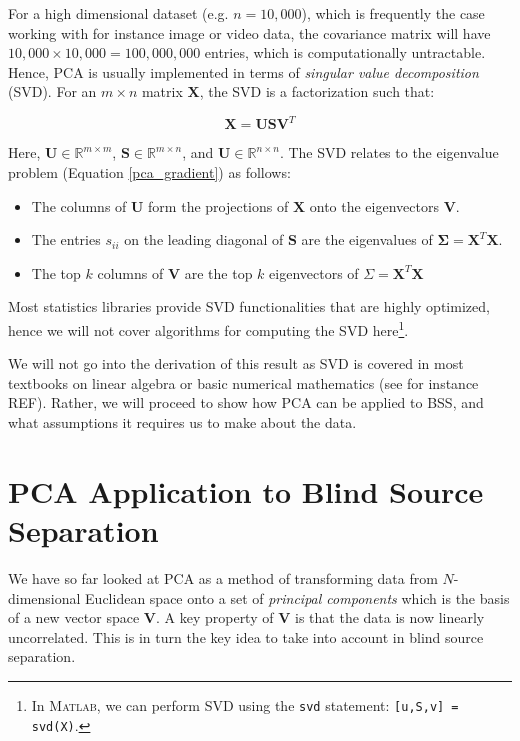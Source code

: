 \documentclass[11pt, oneside, a4paper]{report}
\begin{document}
For a high dimensional dataset (e.g. $n = 10,000$), which is
frequently the case working with for instance image or video data, the
covariance matrix will have $10,000\times 10,000 = 100,000,000$
entries, which is computationally untractable. Hence, PCA is usually
implemented in terms of \emph{singular value decomposition} (SVD). For
an $m\times n$ matrix $\boldsymbol{X}$, the SVD is a factorization
such that:


\begin{equation}
  \boldsymbol{X} = \boldsymbol{USV}^{T}
\end{equation}


Here, $\boldsymbol{U} \in \mathbb{R}^{m\times m}$, $\boldsymbol{S} \in \mathbb{R}^{m\times n}$,
and $\boldsymbol{U} \in \mathbb{R}^{n\times n}$. The SVD relates to the eigenvalue
problem (Equation \ref{pca_gradient}) as follows:


\begin{itemize}
\item The columns of $\boldsymbol{U}$ form the projections of $\boldsymbol{X}$ onto the
  eigenvectors $\boldsymbol{V}$.
  \item The entries $s_{ii}$ on the leading diagonal of $\boldsymbol{S}$ are the
    eigenvalues of $\boldsymbol{\Sigma} = \boldsymbol{X}^T\boldsymbol{X}$.
  \item The top $k$ columns of $\boldsymbol{V}$ are the top $k$ eigenvectors of
    $\Sigma = \boldsymbol{X}^T \boldsymbol{X}$
\end{itemize}


Most statistics libraries provide SVD functionalities that are highly
optimized, hence we will not cover algorithms for computing the SVD
here\footnote{In \textsc{Matlab}, we can perform SVD using the
  \texttt{svd}
statement: \texttt{[u,S,v] = svd(X)}.}.


We will not go into the derivation of this result as SVD is covered
in most textbooks on linear algebra or basic numerical
mathematics (see for instance REF). Rather, we will proceed to show how PCA can be applied to
BSS, and what assumptions it requires us to make about the data.




\section{PCA Application to Blind Source Separation}\label{pca_bss}




We have so far looked at PCA as a method of transforming data from
$N$-dimensional Euclidean space onto a set of \emph{principal components}
which is the basis of a new vector space $\boldsymbol{V}$. A key property of $\boldsymbol{V}$ is
that the data is now linearly uncorrelated. This is in turn the key
idea to take into account in blind source separation.
\end{document}
